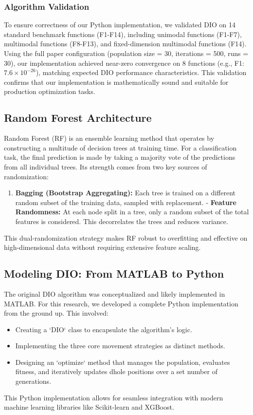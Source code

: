 \documentclass[12pt, a4paper]{article}
\begin{document}
\subsubsection{Algorithm Validation}
To ensure correctness of our Python implementation, we validated DIO on 14 standard benchmark functions (F1-F14), including unimodal functions (F1-F7), multimodal functions (F8-F13), and fixed-dimension multimodal functions (F14). Using the full paper configuration (population size = 30, iterations = 500, runs = 30), our implementation achieved near-zero convergence on 8 functions (e.g., F1: $7.6 \times 10^{-26}$), matching expected DIO performance characteristics. This validation confirms that our implementation is mathematically sound and suitable for production optimization tasks.

\subsection{Random Forest Architecture}
Random Forest (RF) is an ensemble learning method that operates by constructing a multitude of decision trees at training time. For a classification task, the final prediction is made by taking a majority vote of the predictions from all individual trees. Its strength comes from two key sources of randomization:
\begin{enumerate}
    \item \textbf{Bagging (Bootstrap Aggregating):} Each tree is trained on a different random subset of the training data, sampled with replacement.
    - \textbf{Feature Randomness:} At each node split in a tree, only a random subset of the total features is considered. This decorrelates the trees and reduces variance.
\end{enumerate}
This dual-randomization strategy makes RF robust to overfitting and effective on high-dimensional data without requiring extensive feature scaling.

\subsection{Modeling DIO: From MATLAB to Python}
The original DIO algorithm was conceptualized and likely implemented in MATLAB. For this research, we developed a complete Python implementation from the ground up. This involved:
\begin{itemize}
    \item Creating a `DIO` class to encapsulate the algorithm's logic.
    \item Implementing the three core movement strategies as distinct methods.
    \item Designing an `optimize` method that manages the population, evaluates fitness, and iteratively updates dhole positions over a set number of generations.
\end{itemize}
This Python implementation allows for seamless integration with modern machine learning libraries like Scikit-learn and XGBoost.
\end{document}
